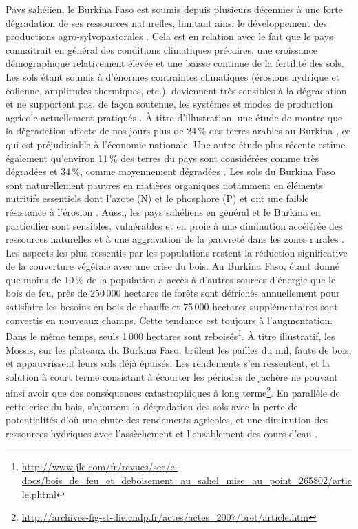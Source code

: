 \documentclass[a4paper,11pt]{article}
\begin{document}
Pays sahélien, le Burkina Faso est soumis depuis plusieurs décennies à
une forte dégradation de ses ressources naturelles, limitant ainsi le
développement des productions agro-sylvopastorales
\cite{Thiombiano_2000}. Cela est en relation avec le fait que le pays
connaitrait en général des conditions climatiques précaires, une
croissance démographique relativement élevée et une baisse continue de
la fertilité des sols. Les sols étant soumis à d'énormes contraintes
climatiques (érosions hydrique et éolienne, amplitudes thermiques,
etc.), deviennent très sensibles à la dégradation et ne supportent
pas, de façon soutenue, les systèmes et modes de production agricole
actuellement pratiqués \cite{PANA_2003}. À titre d'illustration, une
étude de \citeauthor{INERA_2003} montre que la dégradation affecte de
nos jours plus de 24\,\% des terres arables au Burkina
\cite{INERA_2003}, ce qui est préjudiciable à l'économie
nationale. Une autre étude plus récente estime également qu'environ
11\,\% des terres du pays sont considérées comme très dégradées et
34\,\%, comme moyennement dégradées \cite{SPCONEDD_2006}.  Les sols du
Burkina Faso sont naturellement pauvres en matières organiques
notamment en éléments nutritifs essentiels dont l'azote (N) et le
phosphore (P) \cite{Traore_2008} et ont une faible résistance à
l'érosion \cite{Berger_1991}. Aussi, les pays sahéliens en général et
le Burkina en particulier sont sensibles, vulnérables et en proie à
une diminution accélérée des ressources naturelles et à une
aggravation de la pauvreté dans les zones rurales
\cite{Roose_2004}. Les aspects les plus ressentis par les populations
restent la réduction significative de la couverture végétale avec une
crise du bois. Au Burkina Faso, étant donné que moins de 10\,\% de la
population a accès à d'autres sources d'énergie que le bois de feu,
près de 250\,000 hectares de forêts sont défrichés annuellement pour
satisfaire les besoins en bois de chauffe et 75\,000 hectares
supplémentaires sont convertis en nouveaux champs. Cette tendance est
toujours à l'augmentation. Dans le même temps, seuls 1\,000 hectares
sont
reboisés\footnote{\url{http://www.jle.com/fr/revues/sec/e-docs/bois_de_feu_et_deboisement_au_sahel_mise_au_point_265802/article.phtml}}. À
titre illustratif, les Mossis, sur les plateaux du Burkina Faso,
brûlent les pailles du mil, faute de bois, et appauvrissent leurs sols
déjà épuisés. Les rendements s'en ressentent, et la solution à court
terme consistant à écourter les périodes de jachère ne pouvant ainsi
avoir que des conséquences catastrophiques à long
terme\footnote{\url{http://archives-fig-st-die.cndp.fr/actes/actes_2007/bret/article.htm}}.
En parallèle de cette crise du bois, s'ajoutent la dégradation des
sols avec la perte de potentialités d'où une chute des rendements
agricoles, et une diminution des ressources hydriques avec
l'assèchement et l'ensablement des cours d'eau \cite{ZOMBRE_2006}.
\end{document}
